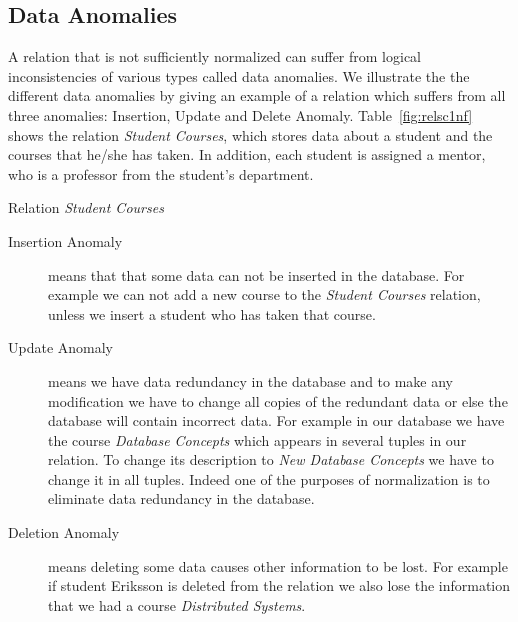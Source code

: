 \subsection{Data Anomalies}
A relation that is not sufficiently normalized can suffer from logical inconsistencies of various types
called data anomalies. We illustrate the the different data anomalies by
giving an example of a relation which suffers from all three anomalies: Insertion, Update and
Delete Anomaly. Table~\ref{fig:relsc1nf}
shows the relation \textit{Student Courses}, which stores data about a student and the courses 
that he/she has taken. In addition, each student is assigned a mentor, who is 
a professor from the student's department. 


%    

\begin{table}
\begin{center}

\caption{Relation \textit{Student Courses}}\label{fig:relsc1nf}
\end{center}
\end{table}

\begin{description}
  \item[Insertion Anomaly] means that that some data can not be 
    inserted in the database. For example we can not add a new course to the \textit{Student Courses}
    relation, unless we insert a student who has taken that course.
  \item[Update Anomaly] means we have data redundancy in the database and to make any 
    modification we have to change all copies of the redundant data or else the 
    database will contain incorrect data. For example in our database we have the course 
    \textit{Database Concepts} which appears in several tuples in our relation. 
    To change its description to \textit{New Database Concepts} we have to change 
    it in all tuples. Indeed one of the purposes of normalization is to eliminate data 
    redundancy in the database.
  \item[Deletion Anomaly] means deleting some data causes other information to be lost. 
    For example if student Eriksson is deleted from the relation we also lose the 
    information that we had a course \textit{Distributed Systems}.
\end{description}

